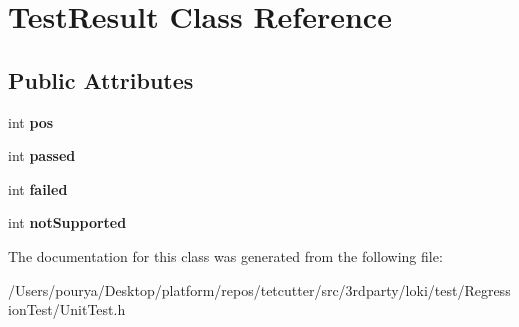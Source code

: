 \hypertarget{classTestResult}{}\section{Test\+Result Class Reference}
\label{classTestResult}
\subsection*{Public Attributes}
\begin{DoxyCompactItemize}
\item 
\hypertarget{classTestResult_ad36b60e01085744b6b90660c8e57ec24}{}int {\bfseries pos}\label{classTestResult_ad36b60e01085744b6b90660c8e57ec24}

\item 
\hypertarget{classTestResult_a43df9d5d19e3bb900ce027feb0254a63}{}int {\bfseries passed}\label{classTestResult_a43df9d5d19e3bb900ce027feb0254a63}

\item 
\hypertarget{classTestResult_abc49aad1827913dee543f563474784cd}{}int {\bfseries failed}\label{classTestResult_abc49aad1827913dee543f563474784cd}

\item 
\hypertarget{classTestResult_a866d7371b5627b4b93a5a98c895597dd}{}int {\bfseries not\+Supported}\label{classTestResult_a866d7371b5627b4b93a5a98c895597dd}

\end{DoxyCompactItemize}


The documentation for this class was generated from the following file\+:\begin{DoxyCompactItemize}
\item 
/\+Users/pourya/\+Desktop/platform/repos/tetcutter/src/3rdparty/loki/test/\+Regression\+Test/Unit\+Test.\+h\end{DoxyCompactItemize}

